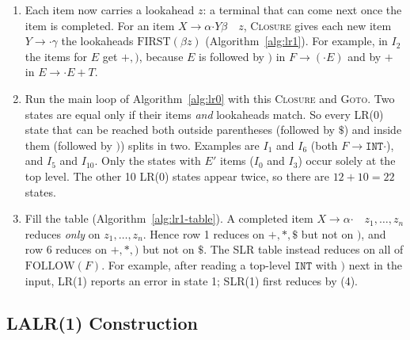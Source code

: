 \documentclass{article}
\newcommand{\tINT}{\mathtt{INT}}
\newcommand{\dt}{\mathbin{\boldsymbol{\cdot}}}
\newcommand{\Sp}{E'}
\newcommand{\la}{\quad} %
\begin{document}
\begin{enumerate}[leftmargin=*]
  \item Each item now carries a lookahead $z$: a terminal that can come next once the
    item is completed.
    For an item $X \to \alpha \dt Y \beta \la z$, \textsc{Closure} gives each new item
    $Y \to \dt \gamma$ the lookaheads $\mathrm{FIRST}(\beta z)$
    (Algorithm~\ref{alg:lr1}).
    For example, in $I_2$ the items for $E$ get $+, )$, because $E$ is followed by $)$
    in $F \to ( \dt E )$ and by $+$ in $E \to \dt E + T$.
  \item Run the main loop of Algorithm~\ref{alg:lr0} with this \textsc{Closure} and
    \textsc{Goto}.
    Two states are equal only if their items \emph{and} lookaheads match.
    So every LR(0) state that can be reached both outside parentheses (followed by $\$$)
    and inside them (followed by $)$) splits in two.
    Examples are $I_1$ and $I_6$ (both $F \to \tINT\dt$), and $I_5$ and $I_{10}$.
    Only the states with $\Sp$ items ($I_0$ and $I_3$) occur solely at the top level.
    The other 10 LR(0) states appear twice, so there are $12 + 10 = 22$ states.
  \item Fill the table (Algorithm~\ref{alg:lr1-table}).
    A completed item $X \to \alpha\dt \la z_1, \dots, z_n$ reduces \emph{only} on
    $z_1, \dots, z_n$.
    Hence row 1 reduces on $+, *, \$$ but not on $)$, and row 6 reduces on $+, *, )$
    but not on $\$$.
    The SLR table instead reduces on all of $\mathrm{FOLLOW}(F)$.
    For example, after reading a top-level $\tINT$ with $)$ next in the input,
    LR(1) reports an error in state 1; SLR(1) first reduces by (4).
\end{enumerate}

\subsection{LALR(1) Construction}
\end{document}
